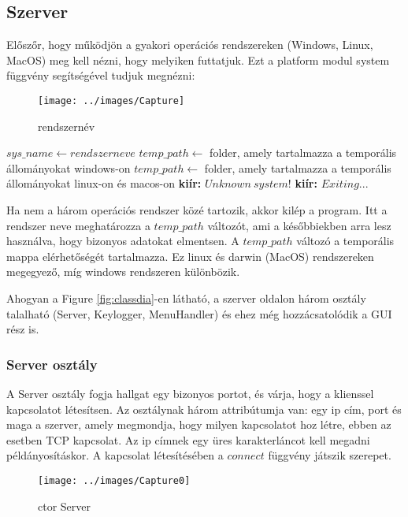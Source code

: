 \documentclass[a4paper, 11pt]{article}
\begin{document}
\subsection{Szerver}\label{subsec:server}
Előszőr, hogy működjön a gyakori operációs rendszereken (Windows, Linux, MacOS) meg kell nézni, hogy melyiken futtatjuk. Ezt a platform modul system függvény segítségével tudjuk megnézni:
\begin{figure}[H]
\centering
\texttt{[image: ../images/Capture]}
\caption{rendszernév}
\label{fig:sysname}
\end{figure}

\begin{algorithmic}[H]
\State $sys\_name \gets rendszer neve$
	\State $temp\_path \gets$ folder, amely tartalmazza a temporális állományokat windows-on
	\State $temp\_path \gets$ folder, amely tartalmazza a temporális állományokat linux-on és macos-on
\Else
	\State \textbf{kiír:} $Unknown\ system!$
	\State \textbf{kiír:} $Exiting...$
\EndIf
\end{algorithmic}

\noindent Ha nem a három operációs rendszer közé tartozik, akkor kilép a program. Itt a rendszer neve meghatározza a $temp\_path$ változót, ami a későbbiekben arra lesz használva, hogy bizonyos adatokat elmentsen. A $temp\_path$ változó a temporális mappa elérhetőségét tartalmazza. Ez linux és darwin (MacOS) rendszereken megegyező, míg windows rendszeren különbözik.

Ahogyan a Figure \ref{fig:classdia}-en látható, a szerver oldalon három osztály talalható (Server, Keylogger, MenuHandler) és ehez még hozzácsatolódik a GUI rész is.

\subsubsection{Server osztály}\label{subsubsec:serverclass}
A Server osztály fogja hallgat egy bizonyos portot, és várja, hogy a klienssel kapcsolatot létesítsen. Az osztálynak három attribútumja van: egy ip cím, port és maga a szerver, amely megmondja, hogy milyen kapcsolatot hoz létre, ebben az esetben TCP kapcsolat. Az ip címnek egy üres karakterláncot kell megadni példányosításkor. A kapcsolat létesítésében a $connect$ függvény játszik szerepet.
\begin{figure}[H]
\centering
\texttt{[image: ../images/Capture0]}
\caption{ctor Server}
\label{fig:ctorserver}
\end{figure}
\end{document}
